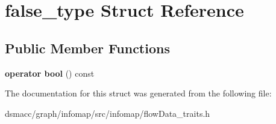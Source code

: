 \hypertarget{structfalse__type}{}\section{false\+\_\+type Struct Reference}
\label{structfalse__type}
\subsection*{Public Member Functions}
\begin{DoxyCompactItemize}
\item 
\mbox{\label{structfalse__type_a7024d436394692de5512174ea9feb3fe}} 
{\bfseries operator bool} () const
\end{DoxyCompactItemize}


The documentation for this struct was generated from the following file\+:\begin{DoxyCompactItemize}
\item 
dsmacc/graph/infomap/src/infomap/flow\+Data\+\_\+traits.\+h\end{DoxyCompactItemize}
